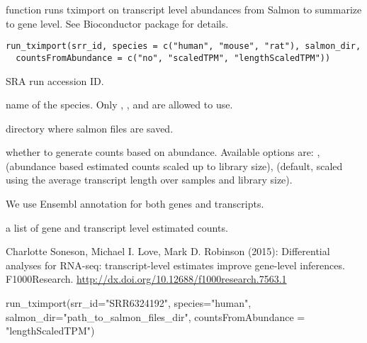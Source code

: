 \documentclass[letterpaper]{book}
\begin{document}
%
\begin{Description}\relax
{} function runs tximport on transcript level abundances from Salmon to summarize to gene level. See Bioconductor package
 for details.
\end{Description}
%
\begin{Usage}
\begin{verbatim}
run_tximport(srr_id, species = c("human", "mouse", "rat"), salmon_dir,
  countsFromAbundance = c("no", "scaledTPM", "lengthScaledTPM"))
\end{verbatim}
\end{Usage}
%
\begin{Arguments}
\begin{ldescription}
\item[\code{srr\_id}] SRA run accession ID.

\item[\code{species}] name of the species. Only , , and  are allowed to use.

\item[\code{salmon\_dir}] directory where salmon files are saved.

\item[\code{countsFromAbundance}] whether to generate counts based on abundance. Available options are: , 
 (abundance based estimated counts scaled up to library size), 
 (default, scaled using the average transcript length over samples and library size).
\end{ldescription}
\end{Arguments}
%
\begin{Details}\relax
We use Ensembl annotation for both genes and transcripts.
\end{Details}
%
\begin{Value}
a list of gene and transcript level estimated counts.
\end{Value}
%
\begin{References}\relax
Charlotte Soneson, Michael I. Love, Mark D. Robinson (2015):
Differential analyses for RNA-seq: transcript-level estimates
improve gene-level inferences. F1000Research.
\url{http://dx.doi.org/10.12688/f1000research.7563.1}
\end{References}
%
\begin{Examples}
\begin{ExampleCode}
run_tximport(srr_id="SRR6324192", species="human", salmon_dir="path_to_salmon_files_dir", 
countsFromAbundance = "lengthScaledTPM")

\end{ExampleCode}
\end{Examples}
\end{document}
